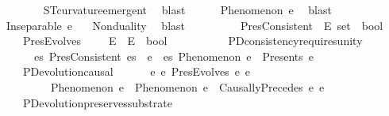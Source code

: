 \begin{isabellebody}
\ \ \ \ \ \ \isamarkupfalse%
\ ST{}{\isacharunderscore}{\kern0pt}curvature{\isacharunderscore}{\kern0pt}emergent\ \isamarkupfalse%
\ blast\isanewline
\ \ \ \ \isamarkupfalse%
\ {\isachardoublequoteopen}Phenomenon\ e{\isachardoublequoteclose}\ \isamarkupfalse%
\ blast\isanewline
\ \ \ \ \isamarkupfalse%
\ {\isachardoublequoteopen}Inseparable\ e\ {\isasymOmega}{\isachardoublequoteclose}\ \isamarkupfalse%
\ Nonduality\ \isamarkupfalse%
\ blast\isanewline
\ \ \isamarkupfalse%
%
\endisatagproof
{\isafoldproof}%
%
\isadelimproof
%
\endisadelimproof
%
\isadelimdocument
%
\endisadelimdocument
%
\isatagdocument
%
\isamarkuptrue%
%
\endisatagdocument
{\isafolddocument}%
%
\isadelimdocument
%
\endisadelimdocument
\ \ \isamarkupfalse%
\isanewline
\ \ \ \ PresConsistent\ {\isacharcolon}{\kern0pt}{\isacharcolon}{\kern0pt}\ {\isachardoublequoteopen}E\ set\ {\isasymRightarrow}\ bool{\isachardoublequoteclose}\ \ \ \isanewline
\ \ \ \ PresEvolves\ \ \ \ {\isacharcolon}{\kern0pt}{\isacharcolon}{\kern0pt}\ {\isachardoublequoteopen}E\ {\isasymRightarrow}\ E\ {\isasymRightarrow}\ bool{\isachardoublequoteclose}\ \ \isanewline
\isanewline
\ \ \isamarkupfalse%
\ \isanewline
\ \ \ \ PD{}{\isacharunderscore}{\kern0pt}consistency{\isacharunderscore}{\kern0pt}requires{\isacharunderscore}{\kern0pt}unity{\isacharcolon}{\kern0pt}\isanewline
\ \ \ \ \ \ {\isachardoublequoteopen}{\isasymforall}es{\isachardot}{\kern0pt}\ PresConsistent\ es\ {\isasymlongrightarrow}\ {\isacharparenleft}{\kern0pt}{\isasymforall}e\ {\isasymin}\ es{\isachardot}{\kern0pt}\ Phenomenon\ e\ {\isasymand}\ Presents\ e\ {\isasymOmega}{\isacharparenright}{\kern0pt}{\isachardoublequoteclose}\ \isanewline
\ \ \ \ PD{}{\isacharunderscore}{\kern0pt}evolution{\isacharunderscore}{\kern0pt}causal{\isacharcolon}{\kern0pt}\isanewline
\ \ \ \ \ \ {\isachardoublequoteopen}{\isasymforall}e{}\ e{}{\isachardot}{\kern0pt}\ PresEvolves\ e{}\ e{}\ {\isasymlongrightarrow}\isanewline
\ \ \ \ \ \ \ \ \ Phenomenon\ e{}\ {\isasymand}\ Phenomenon\ e{}\ {\isasymand}\ CausallyPrecedes\ e{}\ e{}{\isachardoublequoteclose}\ \isanewline
\ \ \ \ PD{}{\isacharunderscore}{\kern0pt}evolution{\isacharunderscore}{\kern0pt}preserves{\isacharunderscore}{\kern0pt}substrate{\isacharcolon}{\kern0pt}\isanewline

\end{isabellebody}
